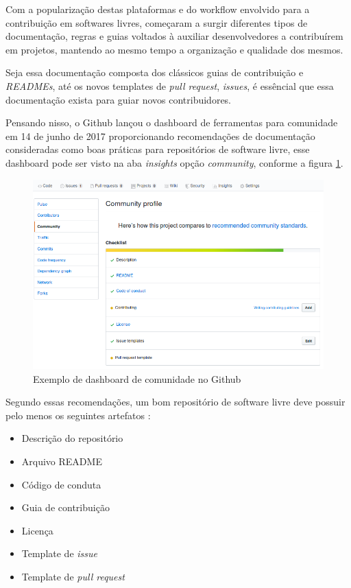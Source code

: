 Com a popularização destas plataformas e do workflow envolvido para a contribuição em softwares livres, começaram a surgir diferentes tipos de documentação, regras e guias voltados à auxiliar desenvolvedores a contribuírem em projetos, mantendo ao mesmo tempo a organização e qualidade dos mesmos.

Seja essa documentação composta dos clássicos  guias de contribuição e \textit{READMEs}, até os novos templates de \textit{pull request}, \textit{issues}, é essêncial que essa documentação exista para guiar novos contribuidores.

Pensando nisso, o Github lançou o dashboard de ferramentas para comunidade em 14 de junho de 2017 \cite{post_github_community_tools} proporcionando recomendações de documentação consideradas como boas práticas para repositórios de software livre, esse dashboard pode ser visto na aba \textit{insights} opção \textit{community}, conforme a figura \ref{Fig_dash_community}.


\begin{figure}[h]
    \centering
    \includegraphics[width=16cm]{figuras/min_dashboard_community.png}
    \caption{Exemplo de dashboard de comunidade no Github}
    \label{Fig_dash_community}
\end{figure}

Segundo essas recomendações, um bom repositório de software livre deve possuir pelo menos os seguintes artefatos \cite{opensource_guidelines_github}:

\begin{itemize}
    \item Descrição do repositório
    \item Arquivo README
    \item Código de conduta
    \item Guia de contribuição
    \item Licença
    \item Template de \textit{issue}
    \item Template de \textit{pull request}
\end{itemize}

